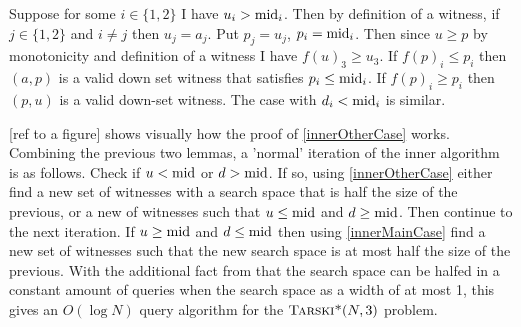 \begin{sproof}
  Suppose for some $i \in \{1, 2\}$ I have $u_i > \text{mid}_i$. Then
  by definition of a witness, if $j \in \{1, 2\}$ and $i \neq j$ then $u_j = a_j$.
  Put $p_j = u_j$, $p_i = \text{mid}_i$. Then since $u \geq p$ by monotonicity
  and definition of a witness I have $f(u)_3 \geq u_3$. If $f(p)_i \leq p_i$ then
  $(a, p)$ is a valid down set witness that satisfies $p_i \leq \text{mid}_i$. If
  $f(p)_i \geq p_i$ then $(p, u)$ is a valid down-set witness.
  The case with $d_i < \text{mid}_i$ is similar.
\end{sproof}
[ref to a figure] shows visually how the proof of \cref{innerOtherCase} works. Combining
the previous two lemmas, a 'normal' iteration of the inner algorithm is as follows.
Check if $u < \text{mid}$ or $d > \text{mid}$. If so, using \cref{innerOtherCase} either find a new
set of witnesses with a search space that is half the size of the previous, or a new of
witnesses such that $u \leq \text{mid}$ and $d \geq \text{mid}$. Then continue to the next iteration.
If $u \geq \text{mid}$ and $d \leq \text{mid}$ then using \cref{innerMainCase} find a new set of witnesses
such that the new search space is at most half the size of the previous.
With the additional fact from \citep{fasterTarski} that the search space can be halfed in a constant amount of
queries when the search space as a width of at most 1, this gives an $O(\log N)$ query algorithm
for the $\textsc{Tarski*}(N, 3)$ problem.
